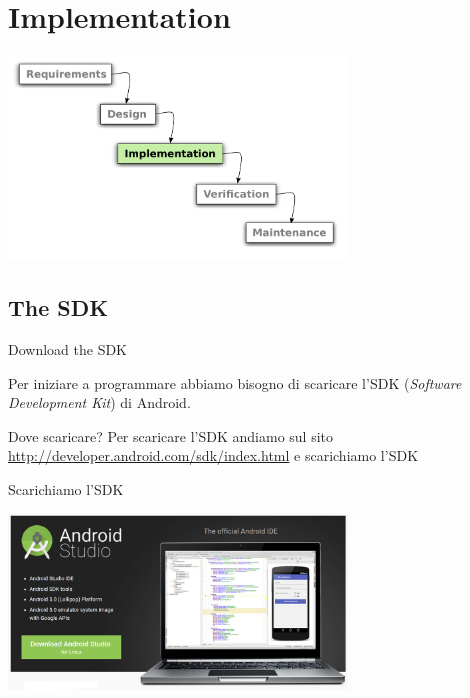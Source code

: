 \documentclass[xcolor=svgnames,11pt]{beamer}
\begin{document}
\section{Implementation}

\begin{frame}
\begin{center}
\includegraphics[width=9cm]{waterfall_3.pdf}
\end{center}
\end{frame}

\subsection{The SDK}

\begin{frame}{Download the SDK}

Per iniziare a programmare abbiamo bisogno di scaricare l'SDK (\emph{Software Development Kit}) di Android.
\pause
\medskip
\begin{block}{Dove scaricare?}
Per scaricare l'SDK andiamo sul sito \url{http://developer.android.com/sdk/index.html} e scarichiamo l'SDK
\end{block}
\end{frame}

\begin{frame}{Scarichiamo l'SDK}
\begin{center}
\includegraphics[width=9cm]{studio.png}
\end{center}
\end{frame}
\end{document}
